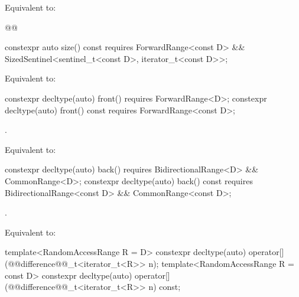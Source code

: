 {\begin{itemdescr}
\pnum
\effects Equivalent to: 
\begin{codeblock}
@@
\end{codeblock}
\end{itemdescr}

%
\begin{itemdecl}
constexpr auto size() const requires ForwardRange<const D> &&
  SizedSentinel<sentinel_t<const D>, iterator_t<const D>>;
\end{itemdecl}

\begin{itemdescr}
\pnum
\effects Equivalent to: 
\end{itemdescr}

%
\begin{itemdecl}
constexpr decltype(auto) front() requires ForwardRange<D>;
constexpr decltype(auto) front() const requires ForwardRange<const D>;
\end{itemdecl}

\begin{itemdescr}
\pnum
\oldtxt{\requires} \newtxt{\expects}
.

\pnum
\effects Equivalent to: 
\end{itemdescr}

%
\begin{itemdecl}
constexpr decltype(auto) back()
  requires BidirectionalRange<D> && CommonRange<D>;
constexpr decltype(auto) back() const
  requires BidirectionalRange<const D> && CommonRange<const D>;
\end{itemdecl}

\begin{itemdescr}
\pnum
\oldtxt{\requires} \newtxt{\expects}
.

\pnum
\effects Equivalent to: 
\end{itemdescr}

%
\begin{itemdecl}
template<RandomAccessRange R = D>
constexpr decltype(auto) operator[](@@difference@@_t<iterator_t<R>> n);
template<RandomAccessRange R = const D>
constexpr decltype(auto) operator[](@@difference@@_t<iterator_t<R>> n) const;
\end{itemdecl}

}

